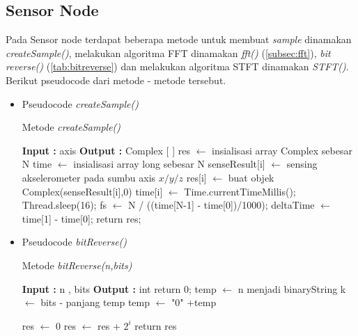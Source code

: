 \subsection{Sensor Node}
Pada Sensor node terdapat beberapa metode untuk membuat {\it sample} dinamakan {\it createSample()}, melakukan algoritma FFT dinamakan {\it fft()} (\ref{subsec:fft}), {\it bit reverse()} (\ref{tab:bitreverse}) dan melakukan algoritma STFT dinamakan {\it STFT()}. Berikut pseudocode dari metode - metode tersebut.
\begin{itemize}
\item Pseudocode {\it createSample()}
	\begin{algorithm}[htbp]
	\label{alg:createSample}
		\caption{Metode {\it createSample()}}
		\begin{algorithmic}[1]
		\State \textbf{Input  :} axis
		\State \textbf{Output :} Complex [ ]
			\State res $\leftarrow$ insialisasi array Complex sebesar N
			\State time $\leftarrow$ insialisasi array long sebesar N
				\State senseResult[i] $\leftarrow$ sensing akselerometer pada sumbu axis $x/y/z$
				\State res[i] $\leftarrow$ buat objek Complex(senseResult[i],0)
				\State time[i] $\leftarrow$ Time.currentTimeMillis();
				\State Thread.sleep(16);
			\EndWhile
			\State fs $\leftarrow$ N / ((time[N-1] - time[0])/1000);
			\State deltaTime $\leftarrow$ time[1] - time[0];
			\State return res;
		\EndFunction
	\end{algorithmic}
	\end{algorithm}

\item Pseudocode {\it bitReverse()}
\begin{algorithm}[htbp]
	\label{alg:bitReverse}
		\caption{Metode {\it bitReverse(n,bits)}}
		\begin{algorithmic}[1]
		\State \textbf{Input  :} n , bits
		\State \textbf{Output :} int
				\State return 0;
			\EndIf
			temp $\leftarrow$ n menjadi binaryString
				\State k $\leftarrow$ bits - panjang temp
					\State temp $\leftarrow$ "0" +temp				
				\EndWhile
			\EndIf
{}
\end{algorithmic}
\end{algorithm}

\begin{algorithm}[H]
\begin{algorithmic}
			\State res $\leftarrow$ 0
					\State res $\leftarrow$ res + $2^i$
				\EndIf
			\EndFor
			\State return res
		\EndFunction
	\end{algorithmic}
	\end{algorithm}


\end{itemize}

